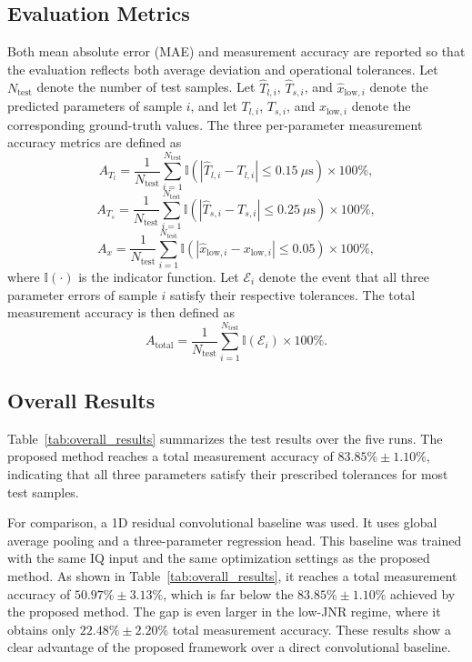 \documentclass[conference]{IEEEtran}
\begin{document}
\subsection{Evaluation Metrics}
Both mean absolute error (MAE) and measurement accuracy are reported so that the evaluation reflects both average deviation and operational tolerances. Let $N_{\text{test}}$ denote the number of test samples. Let $\hat{T}_{l,i}$, $\hat{T}_{s,i}$, and $\hat{x}_{\text{low},i}$ denote the predicted parameters of sample $i$, and let $T_{l,i}$, $T_{s,i}$, and $x_{\text{low},i}$ denote the corresponding ground-truth values. The three per-parameter measurement accuracy metrics are defined as
\begin{equation}
A_{T_l}=\frac{1}{N_{\text{test}}}\sum_{i=1}^{N_{\text{test}}}\mathbb{I}\!\left(\left|\hat{T}_{l,i}-T_{l,i}\right|\le 0.15~\mu\text{s}\right)\times 100\%,
\end{equation}
\begin{equation}
A_{T_s}=\frac{1}{N_{\text{test}}}\sum_{i=1}^{N_{\text{test}}}\mathbb{I}\!\left(\left|\hat{T}_{s,i}-T_{s,i}\right|\le 0.25~\mu\text{s}\right)\times 100\%,
\end{equation}
\begin{equation}
A_{x}=\frac{1}{N_{\text{test}}}\sum_{i=1}^{N_{\text{test}}}\mathbb{I}\!\left(\left|\hat{x}_{\text{low},i}-x_{\text{low},i}\right|\le 0.05\right)\times 100\%,
\end{equation}
where $\mathbb{I}(\cdot)$ is the indicator function. Let $\mathcal{E}_i$ denote the event that all three parameter errors of sample $i$ satisfy their respective tolerances. The total measurement accuracy is then defined as
\begin{equation}
A_{\text{total}}=\frac{1}{N_{\text{test}}}\sum_{i=1}^{N_{\text{test}}}\mathbb{I}(\mathcal{E}_i)\times 100\%.
\end{equation}

\subsection{Overall Results}
Table~\ref{tab:overall_results} summarizes the test results over the five runs. The proposed method reaches a total measurement accuracy of $83.85\%\pm1.10\%$, indicating that all three parameters satisfy their prescribed tolerances for most test samples.

For comparison, a 1D residual convolutional baseline was used. It uses global average pooling and a three-parameter regression head. This baseline was trained with the same IQ input and the same optimization settings as the proposed method. As shown in Table~\ref{tab:overall_results}, it reaches a total measurement accuracy of $50.97\%\pm3.13\%$, which is far below the $83.85\%\pm1.10\%$ achieved by the proposed method. The gap is even larger in the low-JNR regime, where it obtains only $22.48\%\pm2.20\%$ total measurement accuracy. These results show a clear advantage of the proposed framework over a direct convolutional baseline.
\end{document}
